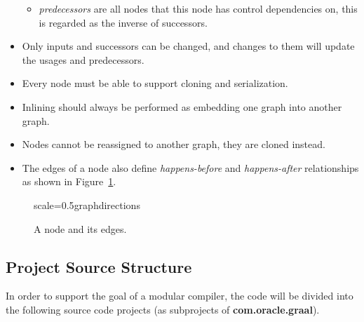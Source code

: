 \documentclass[twocolumn]{svjour3}
\begin{document}
\begin{itemize}
\begin{itemize}
        \item \emph{predecessors} are all nodes that this node has control dependencies on, this is regarded as the inverse of successors.
    \end{itemize}
    \item Only inputs and successors can be changed, and changes to them will update the usages and predecessors.
    \item Every node must be able to support cloning and serialization.
    \item Inlining should always be performed as embedding one graph into another graph.
    \item Nodes cannot be reassigned to another graph, they are cloned instead.
    \item The edges of a node also define \textit{happens-before} and \textit{happens-after} relationships as shown in Figure~\ref{fig:directions}.
\end{itemize}

\begin{figure}[h]
  \label{fig:directions}
  \centering
\begin{digraphenv}{scale=0.5}{graphdirections}
\end{digraphenv}
  \caption{A node and its edges.}
\end{figure}

\subsection{Project Source Structure}
In order to support the goal of a modular compiler, the code will be divided into the following source code projects (as subprojects of \textbf{com.oracle.graal}).
\end{document}
